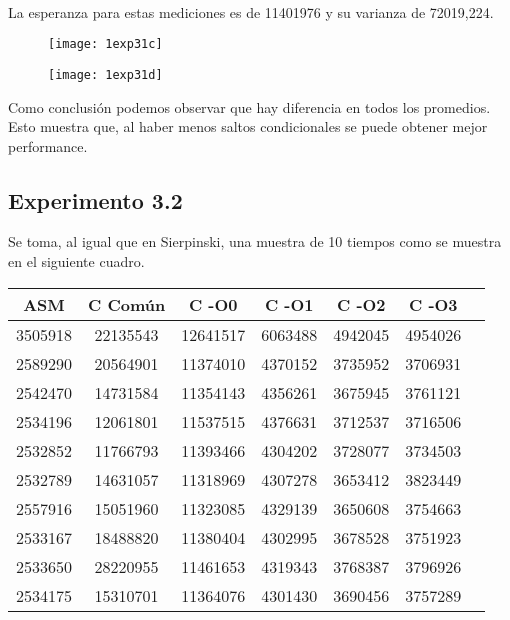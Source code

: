 ﻿\documentclass[a4paper]{article}
\begin{document}
\ \\
La esperanza para estas mediciones es de 11401976 y su varianza de 72019,224.
\ \\


\begin{figure}[h]
  \centering
    \texttt{[image: 1exp31c]}
\end{figure}


\begin{figure}[h]
  \centering
    \texttt{[image: 1exp31d]}
\end{figure}


Como conclusi\'on podemos observar que hay diferencia en todos los promedios. Esto muestra que, al haber menos saltos condicionales se puede obtener mejor performance.
\subsection{Experimento 3.2}
Se toma, al igual que en Sierpinski, una muestra de 10 tiempos como se muestra en el siguiente cuadro.
\begin{center}
  \begin{tabular}{| c | c | c | c | c | c | c |}
    \hline
    ASM & C Com\'un &C -O0 & C -O1 & C -O2 & C -O3\\ 
    \hline\hline
    3505918 &22135543 & 12641517 & 6063488 &4942045 &4954026\\
    \hline
    2589290 &20564901 & 11374010 & 4370152 &3735952 &3706931\\
    \hline
    2542470 &14731584 & 11354143 &4356261 &3675945 &3761121\\
    \hline
    2534196 &12061801 & 11537515 &4376631 &3712537& 3716506\\
    \hline
    2532852 &11766793 & 11393466 & 4304202 &3728077 &3734503\\
    \hline
    2532789 &14631057 & 11318969 &4307278 &3653412 &3823449\\
    \hline
    2557916 &15051960 & 11323085  &4329139 &3650608 &3754663\\
    \hline
    2533167 &18488820 & 11380404 & 4302995 &3678528 &3751923\\
    \hline
    2533650 &28220955 & 11461653 & 4319343 &3768387 &3796926\\
    \hline
    2534175 &15310701 & 11364076 & 4301430 &3690456 &3757289\\
    \hline
  \end{tabular}
\end{center}
\end{document}
